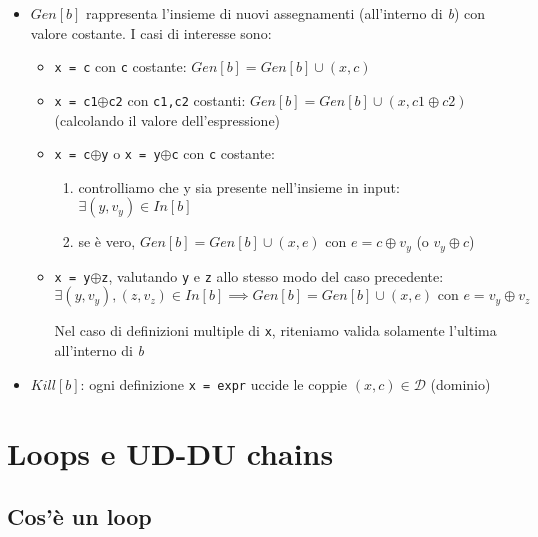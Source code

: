\begin{itemize}
  \item $Gen[b]$ rappresenta l'insieme di nuovi assegnamenti (all'interno di \textit{b}) con valore costante. I casi di interesse sono:
    \begin{itemize}
      \item \lstinline|x = c| con \lstinline|c| costante: $Gen[b] = Gen[b] \cup (x,c)$
      \item \lstinline|x = c1|$\oplus$\lstinline|c2| con \lstinline|c1,c2| costanti: $Gen[b] = Gen[b] \cup (x,c1\oplus c2)$ (calcolando il valore dell'espressione)
      \item \lstinline|x = c|$\oplus$\lstinline|y| o \lstinline|x = y|$\oplus$\lstinline|c| con \lstinline|c| costante:
        \begin{enumerate}
          \item controlliamo che y sia presente nell'insieme in input: $\exists (y,v_{y}) \in In[b]$
          \item se \`e vero, $Gen[b] = Gen[b] \cup (x,e)$ con $e = c\oplus v_{y}$ (o $v_{y}\oplus c$)
        \end{enumerate}
      \item \lstinline|x = y|$\oplus$\lstinline|z|, valutando \lstinline|y| e \lstinline|z| allo stesso modo del caso precedente:
        \begin{equation*}
          \exists (y,v_{y}), (z,v_{z})\in In[b] \implies Gen[b] = Gen[b] \cup (x,e) \text{~con~} e=v_{y}\oplus v_{z}
        \end{equation*}

        \begin{mdframed}
          Nel caso di definizioni multiple di \lstinline|x|, riteniamo valida solamente l'ultima all'interno di \textit{b}
        \end{mdframed}
    \end{itemize}
  \item $Kill[b]$: ogni definizione \lstinline|x = expr| uccide le coppie $(x,c)\in \mathcal{D}$ (dominio)
\end{itemize}

\section{Loops e UD-DU chains}

\subsection{Cos'\`e un loop}


